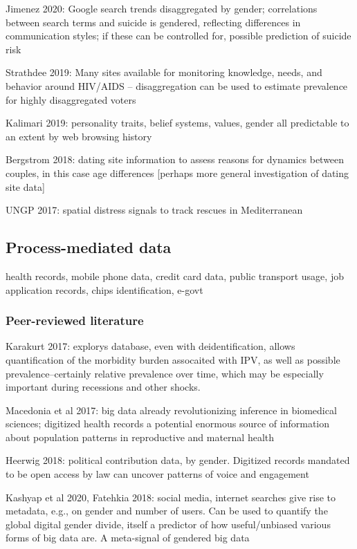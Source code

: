 \documentclass{article}
\begin{document}
Jimenez 2020: Google search trends disaggregated by gender; correlations between search terms and suicide is gendered, reflecting differences in communication styles; if these can be controlled for, possible prediction of suicide risk

Strathdee 2019: Many sites available for monitoring knowledge, needs, and behavior around HIV/AIDS -- disaggregation can be used to estimate prevalence for highly disaggregated voters

Kalimari 2019: personality traits, belief systems, values, gender all predictable to an extent by web browsing history

Bergstrom 2018: dating site information to assess reasons for dynamics between couples, in this case age differences [perhaps more general investigation of dating site data]

UNGP 2017: spatial distress signals to track rescues in Mediterranean

\subsection{Process-mediated data}

health records, mobile phone data, credit card data, public transport usage, job application records, chips identification, e-govt



\subsubsection{Peer-reviewed literature}

Karakurt 2017: explorys database, even with deidentification, allows quantification of the morbidity burden assocaited with IPV, as well as possible prevalence--certainly relative prevalence over time, which may be especially important during recessions and other shocks.

Macedonia et al 2017: big data already revolutionizing inference in biomedical sciences; digitized health records a potential enormous source of information about population patterns in reproductive and maternal health   

Heerwig 2018: political contribution data, by gender. Digitized records mandated to be open access by law can uncover patterns of voice and engagement

Kashyap et al 2020, Fatehkia 2018: social media, internet searches give rise to metadata, e.g., on gender and number of users. Can be used to quantify the global digital gender divide, itself a predictor of how useful/unbiased various forms of big data are. A meta-signal of gendered big data
\end{document}
